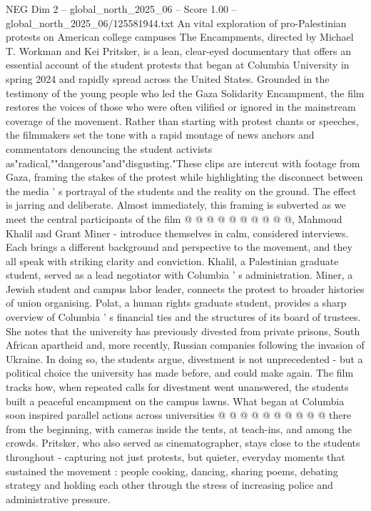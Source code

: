 \begin{textsample}{NEG Dim 2 – global\_north\_2025\_06 – Score 1.00 – global\_north\_2025\_06/125581944.txt}  \label{ex:f2_neg_084}
An vital exploration of pro-Palestinian protests on American college campuses The Encampments, directed by Michael T.
Workman and Kei Pritsker, is a lean, clear-eyed documentary that offers an essential account of the student protests that began at Columbia University in spring 2024 and rapidly spread across the United States.
Grounded in the testimony of the young people who led the Gaza Solidarity Encampment, the film restores the voices of those who were often vilified or ignored in the mainstream coverage of the movement.
Rather than starting with protest chants or speeches, the filmmakers set the tone with a rapid montage of news anchors and commentators denouncing the student activists as"radical,""dangerous"and"disgusting."These clips are intercut with footage from Gaza, framing the stakes of the protest while highlighting the disconnect between the media ' s portrayal of the students and the reality on the ground.
The effect is jarring and deliberate.
Almost immediately, this framing is subverted as we meet the central participants of the film @ @ @ @ @ @ @ @ @ @, Mahmoud Khalil and Grant Miner - introduce themselves in calm, considered interviews.
Each brings a different background and perspective to the movement, and they all speak with striking clarity and conviction.
Khalil, a Palestinian graduate student, served as a lead negotiator with Columbia ' s administration.
Miner, a Jewish student and campus labor leader, connects the protest to broader histories of union organising.
Polat, a human rights graduate student, provides a sharp overview of Columbia ' s financial ties and the structures of its board of trustees.
She notes that the university has previously divested from private prisons, South African apartheid and, more recently, Russian companies following the invasion of Ukraine.
In doing so, the students argue, divestment is not unprecedented - but a political choice the university has made before, and could make again.
The film tracks how, when repeated calls for divestment went unanswered, the students built a peaceful encampment on the campus lawns.
What began at Columbia soon inspired parallel actions across universities @ @ @ @ @ @ @ @ @ @ there from the beginning, with cameras inside the tents, at teach-ins, and among the crowds.
Pritsker, who also served as cinematographer, stays close to the students throughout - capturing not just protests, but quieter, everyday moments that sustained the movement : people cooking, dancing, sharing poems, debating strategy and holding each other through the stress of increasing police and administrative pressure.

\end{textsample}
